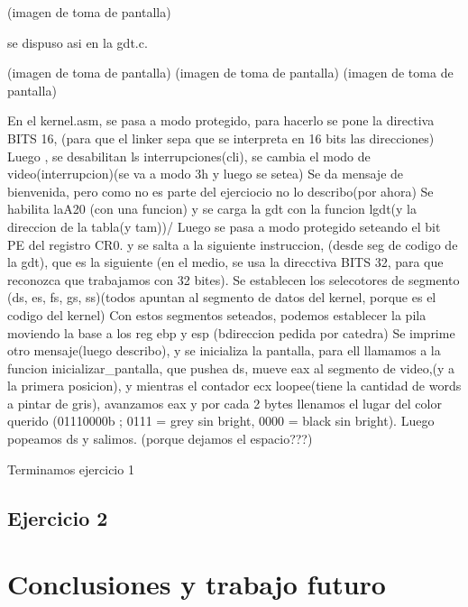 \documentclass[a4paper]{article}
\begin{document}
(imagen de toma de pantalla)

se dispuso asi en la gdt.c.


(imagen de toma de pantalla)
(imagen de toma de pantalla)
(imagen de toma de pantalla)

En el kernel.asm, se pasa a modo protegido, para hacerlo se pone la directiva BITS 16, (para que el linker sepa que se interpreta en 16 bits las direcciones)
Luego , se desabilitan ls interrupciones(cli), se cambia el modo de video(interrupcion)(se va a modo 3h y luego   se setea) 
Se da mensaje de bienvenida, pero como no es parte del ejerciocio no lo describo(por ahora)
Se habilita laA20 (con una funcion) y se carga la gdt con la funcion lgdt(y la direccion de la tabla(y tam))/
Luego se pasa a modo protegido seteando el bit PE del registro CR0. y se salta a la siguiente instruccion, (desde seg de codigo de la gdt), que es la siguiente (en el medio, se usa la direcctiva BITS 32, para que reconozca que trabajamos con 32 bites). Se establecen los selecotores de segmento (ds, es, fs, gs, ss)(todos apuntan al segmento de datos del kernel, porque es el codigo del kernel)
Con estos segmentos seteados, podemos establecer la pila moviendo la base a los reg ebp y esp (bdireccion pedida por catedra)
Se imprime otro mensaje(luego describo), y se inicializa la pantalla, para ell llamamos a la funcion inicializar_pantalla, que pushea ds, mueve eax al segmento de video,(y a la primera posicion), y mientras el contador ecx loopee(tiene la cantidad de words a pintar de gris), avanzamos eax y por cada 2 bytes llenamos el lugar del color querido (01110000b ; 0111 = grey sin bright, 0000 = black sin bright). Luego popeamos ds y salimos. (porque dejamos el espacio???)
   
Terminamos ejercicio 1

\subsection{Ejercicio 2}





\section{Conclusiones y trabajo futuro}
\end{document}
